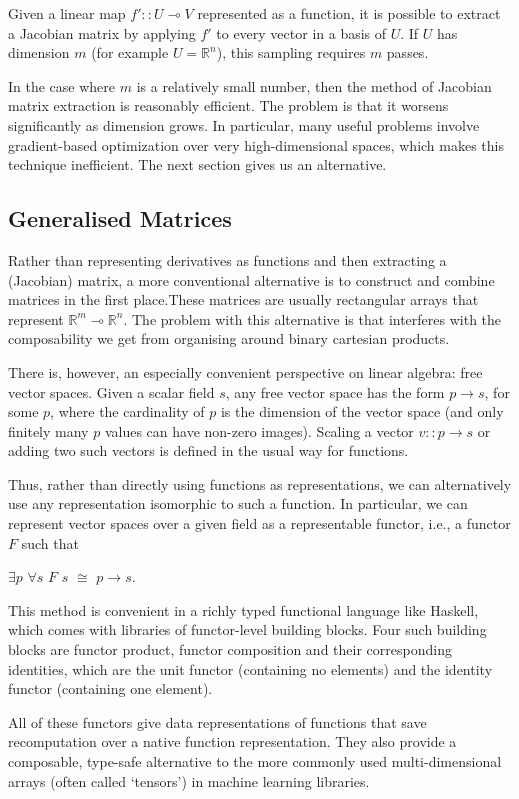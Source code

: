 \documentclass[11pt,a4]{article}
\def\R{\mathbb{R}}
\theoremstyle{definition}
\theoremstyle{Definition}
\theoremstyle{Definition}
\begin{document}
	Given a linear map $f' :: U \multimap V$ represented as a function, it is possible to extract a Jacobian matrix by applying $f'$ to every vector in a basis of $U$. If $U$ has dimension $m$ (for example $U=\R^n$), this sampling requires $m$ passes. 
	\par In the case where $m$ is a relatively small number, then the method of Jacobian matrix extraction is reasonably efficient. The problem is that it worsens significantly as dimension grows. In particular, many useful problems involve gradient-based optimization over very high-dimensional spaces, which makes this technique inefficient. The next section gives us an alternative.
	
	\newpage
	
	\subsection{Generalised Matrices}
	
	Rather than representing derivatives as functions and then extracting a (Jacobian) matrix, a more
	conventional alternative is to construct and combine matrices in the first place.These matrices are
	usually rectangular arrays that represent $ \R^m \multimap \R^n$. The problem with this alternative is that interferes with the composability we get from organising around binary cartesian products.
	\par There is, however, an especially convenient perspective on linear algebra: free vector spaces. Given a scalar field $s$, any free vector space has the form $p \to s$, for some $p$, where the cardinality of $p$ is the dimension of the vector space (and only finitely many $p$ values can have non-zero images). Scaling a vector $v :: p \to s$ or adding two such vectors is defined in the usual way for functions.
	
	\par Thus, rather than directly using functions as representations, we can alternatively use any representation isomorphic to such a function. In particular, we can represent vector spaces over a given field as a representable functor, i.e., a functor $F$ such that
	
	$\exists p$ $\forall s$ $F$ $s$ $\cong$ $p \to s$.
	
	This method is convenient in a richly typed functional language like Haskell, which comes with libraries of functor-level building blocks. Four such building blocks are functor product, functor composition and their corresponding identities, which are the unit functor (containing no elements) and the identity functor (containing one element).
	\par All of these functors give data representations of functions that save recomputation over a native
	function representation. They also provide a composable, type-safe alternative to the more commonly used multi-dimensional arrays (often called \enquote*{tensors}) in machine learning libraries.
\end{document}
